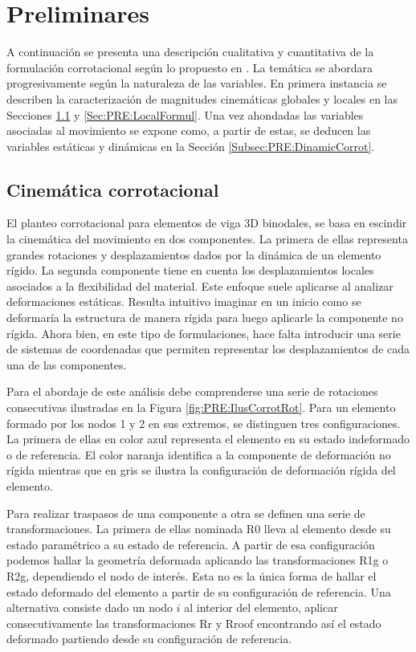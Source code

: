 \chapter{Preliminares}\label{Cap:Preliminares}
\linenumbers

A continuación se presenta una descripción cualitativa y cuantitativa de la formulación corrotacional según lo propuesto en \citep{Le2014}. La temática se abordara progresivamente según la naturaleza de las variables. En primera instancia se describen la caracterización de magnitudes cinemáticas globales y locales en las Secciones \ref{Subsec:PRE:CienmaticCorrot} y \ref{Sec:PRE:LocalFormul}. Una vez ahondadas las variables asociadas al movimiento se expone como, a partir de estas, se deducen las variables estáticas y dinámicas en la Sección \ref{Subsec:PRE:DinamicCorrot}.


\section{Cinemática corrotacional}\label{Subsec:PRE:CienmaticCorrot}

El planteo corrotacional para elementos de viga 3D binodales, se basa en escindir la cinemática del movimiento en dos componentes. La primera de ellas representa grandes rotaciones y desplazamientos dados por la dinámica de un elemento rígido. La segunda componente tiene en cuenta los desplazamientos locales asociados a la flexibilidad del material. Este enfoque suele aplicarse al analizar deformaciones estáticas. Resulta intuitivo imaginar en un inicio como se deformaría la estructura de manera rígida para luego aplicarle la componente no rígida. Ahora bien, en este tipo de formulaciones, hace falta introducir una serie de sistemas de coordenadas que permiten representar los desplazamientos de cada una de las componentes.

Para el abordaje de este análisis debe comprenderse una serie de rotaciones consecutivas ilustradas en la Figura \ref{fig:PRE:IlusCorrotRot}. Para un elemento formado por los nodos 1 y 2 en sus extremos, se distinguen tres configuraciones. La primera de ellas en color azul representa el elemento en su estado indeformado o de referencia. El color naranja identifica a la componente de deformación no rígida mientras que en gris se ilustra la configuración de deformación rígida del elemento. 

Para realizar traspasos de una componente a otra se definen una serie de transformaciones. La primera de ellas nominada \gls{R0} lleva al elemento desde su estado paramétrico a su estado de referencia. A partir de esa configuración podemos hallar la geometría deformada aplicando las transformaciones \gls{R1g} o \gls{R2g}, dependiendo el nodo de interés. Esta no es la única forma de hallar el estado deformado del elemento a partir de su configuración de referencia. Una alternativa consiste dado un nodo $i$ al interior del elemento, aplicar consecutivamente las transformaciones \gls{Rr} y \gls{Rroof} encontrando así el estado deformado partiendo desde su configuración de referencia.  

